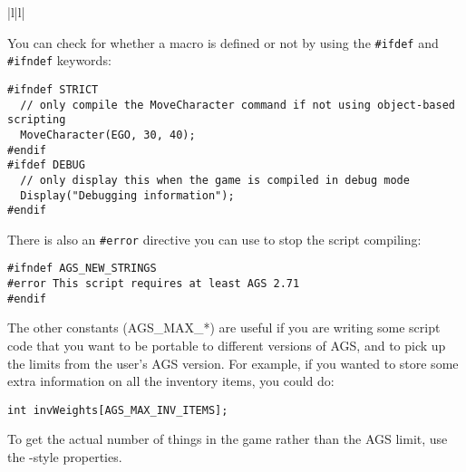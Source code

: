 \begin{tabular}{|l|l|}
\end{tabular}

You can check for whether a macro is defined or not by using the \verb$#ifdef$ and
\verb$#ifndef$ keywords:
\begin{verbatim}
#ifndef STRICT
  // only compile the MoveCharacter command if not using object-based scripting
  MoveCharacter(EGO, 30, 40);
#endif
#ifdef DEBUG
  // only display this when the game is compiled in debug mode
  Display("Debugging information");
#endif
\end{verbatim}
There is also an \verb$#error$ directive you can use to stop the script compiling:
\begin{verbatim}
#ifndef AGS_NEW_STRINGS
#error This script requires at least AGS 2.71
#endif
\end{verbatim}

The other constants (AGS_MAX_*) are useful if you are writing some script code that you
want to be portable to different versions of AGS, and to pick up the limits from the user's
AGS version. For example, if you wanted to store some extra information on all the inventory
items, you could do:
\begin{verbatim}
int invWeights[AGS_MAX_INV_ITEMS];
\end{verbatim}
To get the actual number of things in the game rather than the AGS limit, use the
-style properties.


